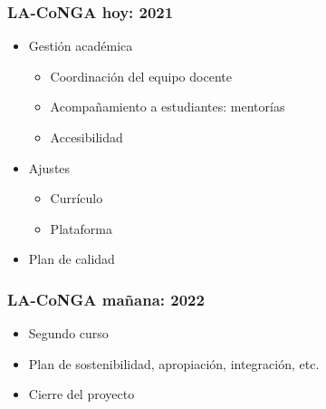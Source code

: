 \begin{frame}[fragile]
\frametitle{LA-CoNGA hoy: 2021}
\begin{itemize}
	\item Gestión académica
	\begin{itemize}
		\item Coordinación del equipo docente
		\item Acompañamiento a estudiantes: mentorías
		\item Accesibilidad
		\end{itemize}		
	\item Ajustes
	\begin{itemize}
		\item Currículo
		\item Plataforma
		\end{itemize}
	\item Plan de calidad
	\end{itemize}
\end{frame}

\begin{frame}[fragile]
\frametitle{LA-CoNGA mañana: 2022}

\begin{itemize}
	\item Segundo curso
	\item Plan de sostenibilidad, apropiación, integración, etc.
	\item Cierre del proyecto
	\end{itemize}
\end{frame}
